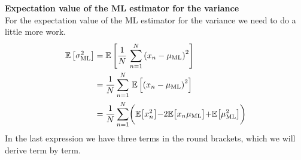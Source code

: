 \documentclass[11pt,DINA4, fleqn]{amsart}
\begin{document}
\noindent
\textbf{Expectation value of the ML estimator for the variance}\\
For the expectation value of the ML estimator for the variance we need to do a little more work.
\begin{align}
\mathbb{E}\left[\sigma^2_{\text{ML}}\right] &= 
\mathbb{E}\left[\dfrac{1}{N} \, \sum\displaylimits_{n=1}^{N} \left( x_n - \mu_{\text{ML}}\right)^2\right] \\
&= \dfrac{1}{N} \sum \displaylimits_{n=1}^{N} \, \mathbb{E}\left[ \left(x_n - \mu_{\text{ML}}\right)^2\right] \\
&= \dfrac{1}{N} \sum \displaylimits_{n=1}^{N}
\biggl(
\mathbb{E}\bigl[x_n^2\bigl] - 2 \mathbb{E}\bigl[x_n\mu_{\text{ML}}\bigl]
+ \mathbb{E}\bigl[\mu_{\text{ML}}^2\bigl]
\biggl)
\label{eq:3summands}
\end{align}
In the last expression we have three terms in the round brackets, which we will derive term by term.
\end{document}
